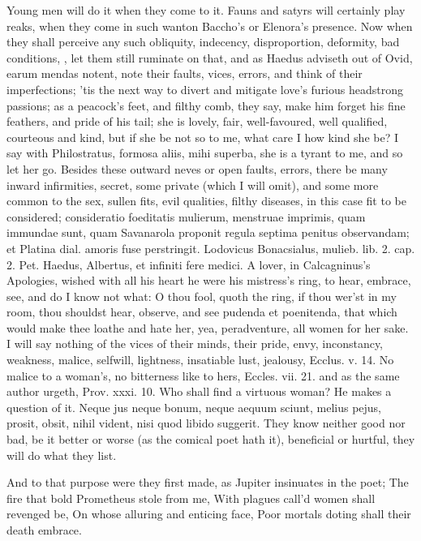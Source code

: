 {Young men will do it when they come to it. Fauns and satyrs will
certainly play reaks, when they come in such wanton Baccho's or
Elenora's presence. Now when they shall perceive any such obliquity,
indecency, disproportion, deformity, bad conditions, \etc{}, let them
still ruminate on that, and as Haedus adviseth out of Ovid, earum
mendas notent, note their faults, vices, errors, and think of their
imperfections; 'tis the next way to divert and mitigate love's furious
headstrong passions; as a peacock's feet, and filthy comb, they say,
make him forget his fine feathers, and pride of his tail; she is
lovely, fair, well-favoured, well qualified, courteous and kind, but if
she be not so to me, what care I how kind she be? I say with
Philostratus, formosa aliis, mihi superba, she is a tyrant to me,
and so let her go. Besides these outward neves or open faults, errors,
there be many inward infirmities, secret, some private (which I will
omit), and some more common to the sex, sullen fits, evil qualities,
filthy diseases, in this case fit to be considered; consideratio
foeditatis mulierum, menstruae imprimis, quam immundae sunt, quam
Savanarola proponit regula septima penitus observandam; et Platina
dial. amoris fuse perstringit. Lodovicus Bonacsialus, mulieb. lib. 2.
cap. 2. Pet. Haedus, Albertus, et infiniti fere medici. A lover,
in Calcagninus's Apologies, wished with all his heart he were his
mistress's ring, to hear, embrace, see, and do I know not what: O thou
fool, quoth the ring, if thou wer'st in my room, thou shouldst hear,
observe, and see pudenda et poenitenda, that which would make thee
loathe and hate her, yea, peradventure, all women for her sake.
I will say nothing of the vices of their minds, their pride, envy,
inconstancy, weakness, malice, selfwill, lightness, insatiable lust,
jealousy, Ecclus. v. 14. No malice to a woman's, no bitterness like to
hers, Eccles. vii. 21. and as the same author urgeth, Prov. xxxi. 10.
Who shall find a virtuous woman? He makes a question of it. Neque jus
neque bonum, neque aequum sciunt, melius pejus, prosit, obsit, nihil
vident, nisi quod libido suggerit. They know neither good nor bad, be
it better or worse (as the comical poet hath it), beneficial or
hurtful, they will do what they list.

And to that purpose were they first made, as Jupiter insinuates in the poet;
The fire that bold Prometheus stole from me,
With plagues call'd women shall revenged be,
On whose alluring and enticing face,
Poor mortals doting shall their death embrace.

}
